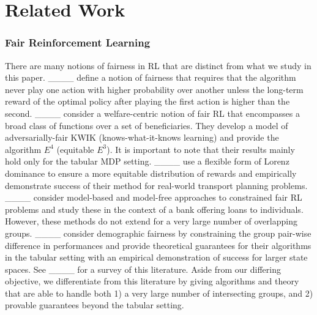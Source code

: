 \section{Related Work}
\subsubsection{Fair Reinforcement Learning}
There are many notions of fairness in RL that are distinct from what we study in this paper. ____ define a notion of fairness that requires that the algorithm never play one action with higher probability over another unless the long-term reward of the optimal policy after playing the first action is higher than the second. 
____ consider a welfare-centric notion of fair RL that encompasses a broad class of functions over a set of beneficiaries. They develop a model of adversarially-fair KWIK (knows-what-it-knows learning) and provide the algorithm $E^4$ (equitable $E^3$). It is important to note that their results mainly hold only for the tabular MDP setting.
____ use a flexible form of Lorenz dominance to ensure a more equitable distribution of rewards and empirically demonstrate success of their method for real-world transport planning problems.
____ consider model-based and model-free approaches to constrained fair RL problems and study these in the context of a bank offering loans to individuals. However, these methods do not extend for a very large number of overlapping groups.
____ consider demographic fairness by constraining the group pair-wise difference in performances and provide theoretical guarantees for their algorithms in the tabular setting with an empirical demonstration of success for larger state spaces.
See ____ for a survey of this literature. Aside from our differing objective, we differentiate from this literature by giving algorithms and theory that are able to handle both 1) a very large number of intersecting groups, and 2) provable guarantees beyond the tabular setting. 


